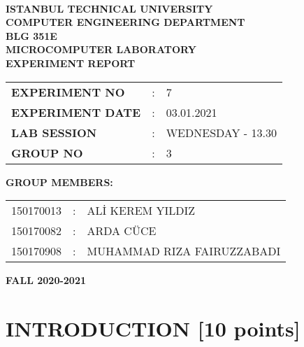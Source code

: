 \documentclass[pdftex,12pt,a4paper]{article}
\begin{document}
\begin{titlepage}
\begin{center}
\textbf{}\\
\textbf{\Large{ISTANBUL TECHNICAL UNIVERSITY}}\\
\vspace{0.5cm}
\textbf{\Large{COMPUTER ENGINEERING DEPARTMENT}}\\
\vspace{2cm}
\textbf{\Large{BLG 351E\\ MICROCOMPUTER LABORATORY\\ EXPERIMENT REPORT}}\\
\vspace{2.8cm}
\begin{table}[ht]
\centering
\Large{
\begin{tabular}{lcl}
\textbf{EXPERIMENT NO}  & : & 7 \\
\textbf{EXPERIMENT DATE}  & : & 03.01.2021 \\
\textbf{LAB SESSION}  & : & WEDNESDAY - 13.30 \\
\textbf{GROUP NO}  & : & 3 \\
\end{tabular}}
\end{table}
\vspace{1cm}
\textbf{\Large{GROUP MEMBERS:}}\\
\begin{table}[ht]
\centering
\Large{
\begin{tabular}{rcl}
150170013  & : & ALİ KEREM YILDIZ \\
150170082  & : & ARDA CÜCE \\
150170908  & : & MUHAMMAD RIZA FAIRUZZABADI \\
\end{tabular}}
\end{table}
\vspace{2.8cm}
\textbf{\Large{FALL 2020-2021}}

\end{center}

\end{titlepage}

\thispagestyle{empty}
\setcounter{tocdepth}{4}
\tableofcontents
\clearpage

\setcounter{page}{1}

\section{INTRODUCTION [10 points]}
\end{document}
